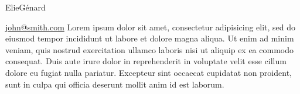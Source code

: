 \documentclass[a4paper]{genard-cv}
\begin{document}
	


\begin{header1}{Elie}{Génard}
\end{header1}

\begin{body}
\end{body}

\begin{aside}
	\href{mailto:john@smith.com}{john@smith.com}
	Lorem ipsum dolor sit amet, consectetur adipisicing elit, sed do eiusmod
	tempor incididunt ut labore et dolore magna aliqua. Ut enim ad minim veniam,
	quis nostrud exercitation ullamco laboris nisi ut aliquip ex ea commodo
	consequat. Duis aute irure dolor in reprehenderit in voluptate velit esse
	cillum dolore eu fugiat nulla pariatur. Excepteur sint occaecat cupidatat non
	proident, sunt in culpa qui officia deserunt mollit anim id est laborum.
\end{aside}
\end{document}
